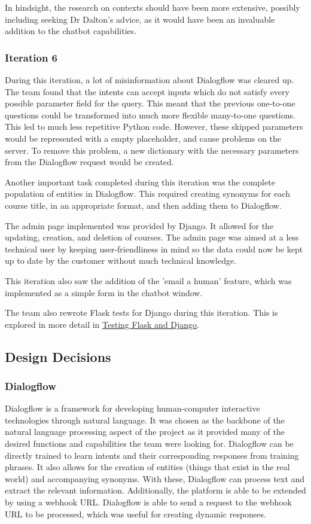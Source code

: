 \documentclass{l3proj}
\begin{document}
In hindsight, the research on contexts should have been more extensive, possibly including seeking Dr Dalton's advice, as it would have been an invaluable addition to the chatbot capabilities.


\subsubsection{Iteration 6}
\label{subsubsec:iter6}
During this iteration, a lot of misinformation about Dialogflow was cleared up. The team found that the intents can accept inputs which do not satisfy every possible parameter field for the query. This meant that the previous one-to-one questions could be transformed into much more flexible many-to-one questions. This led to much less repetitive Python code. However, these skipped parameters would be represented with a empty placeholder, and cause problems on the server. To remove this problem, a new dictionary with the necessary parameters from the Dialogflow request would be created.

Another important task completed during this iteration was the complete population of entities in Dialogflow.  This required creating synonyms for each course title, in an appropriate format, and then adding them to Dialogflow. 

The admin page implemented was provided by Django. It allowed for the updating, creation, and deletion of courses. The admin page was aimed at a less technical user by keeping user-friendliness in mind so the data could now be kept up to date by the customer without much technical knowledge.

This iteration also saw the addition of the 'email a human' feature, which was implemented as a simple form in the chatbot window.

The team also rewrote Flask tests for Django during this iteration. This is explored in more detail in \hyperref[subsubsec:testpython]{Testing Flask and Django}.


\subsection{Design Decisions}
\label{subsec:designdecisions}
\subsubsection{Dialogflow}
\label{subsubsec:df}
Dialogflow is a framework for developing human-computer interactive technologies through natural language. It was chosen as the backbone of the natural language processing aspect of the project as it provided many of the desired functions and capabilities the team were looking for. Dialogflow can be directly trained to learn intents and their corresponding responses from training phrases. It also allows for the creation of entities (things that exist in the real world) and accompanying synonyms. With these, Dialogflow can process text and extract the relevant information. Additionally, the platform is able to be extended by using a webhook URL. Dialogflow is able to send a request to the webhook URL to be processed, which was useful for creating dynamic responses.
\end{document}
